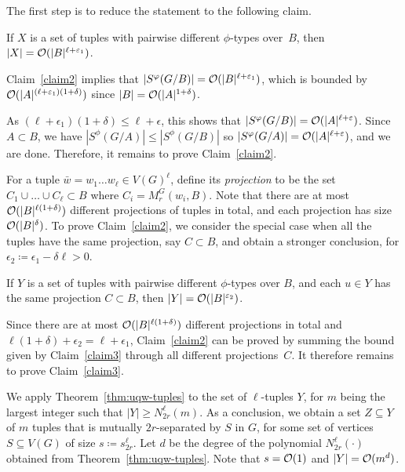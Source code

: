 	\setcounter{claim}{0}
%	
The first step is to reduce the statement to the following claim.

\begin{claim}\label{claim2}
If $X$ is a set of tuples with pairwise different $\phi$-types over~$B$, then $|X|=\mathcal{O}(|B|^{\ell+\varepsilon_1})$.
\end{claim}	

Claim~\ref{claim2} implies that $|S^\varphi(G/B)|=\mathcal{O}(|B|^{\ell+\varepsilon_1})$, 
which is bounded by $\mathcal{O}(|A|^{(\ell+\varepsilon_1)(1+\delta)})$ since $|B|=\mathcal{O}(|A|^{1+\delta})$. 

As $(\ell+\epsilon_1)(1+\delta)\le \ell+\epsilon$, this shows that $|S^\varphi(G/B)|=\mathcal{O}(|A|^{\ell+\varepsilon})$.
Since $A\subset B$, 
we have $|S^\phi(G/A)|\le |S^\phi(G/B)|$ so
 $|S^\varphi(G/A)|=\mathcal{O}(|A|^{\ell+\varepsilon})$, and we are done. Therefore, it remains to prove Claim~\ref{claim2}.

\medskip

For a tuple $\bar w=w_1\ldots w_\ell\in V(G)^\ell$, define its \emph{projection}
to be the set $C_1\cup\ldots\cup C_\ell\subset B$ where  
$C_i=M^G_r(w_i, B)$. Note that there are at most 
$\mathcal{O}(|B|^{\ell(1+\delta)})$ different projections of tuples in total, and each projection has size $\mathcal{O}(|B|^\delta)$.
To prove Claim~\ref{claim2}, we consider the special case when all the tuples have the same projection, say $C\subset B$, and  obtain a stronger conclusion,
for $\epsilon_2\coloneqq \epsilon_1-\delta\ell>0$.

\begin{claim}\label{claim3}
If $Y$ is a set of tuples with pairwise different $\phi$-types over $B$, and each $u\in Y$ has the same projection $C\subset B$, then $|Y|=\mathcal{O}(|B|^{\varepsilon_2})$.
\end{claim}

Since there are at most $\mathcal{O}(|B|^{\ell(1+\delta)})$ different projections in total and $\ell(1+\delta)+\epsilon_2=\ell+\epsilon_1$, Claim~\ref{claim2} can be proved
by summing the bound given by Claim~\ref{claim3} through all different projections~$C$.
It therefore remains to prove Claim~\ref{claim3}.

\medskip

We apply Theorem~\ref{thm:uqw-tuples} to the set of $\ell$-tuples $Y$, for $m$ being the largest integer such that $|Y|\ge N^{\ell}_{2r}(m)$.
  As a conclusion, we obtain a set $Z\subseteq Y$ of $m$ tuples that is mutually $2r$-separated by $S$ in $G$, for some set of vertices $S\subseteq V(G)$ of size $s\coloneqq s^{\ell}_{2r}$.
  Let $d$ be the degree of the polynomial $N^\ell_{2r}(\cdot)$ obtained from Theorem~\ref{thm:uqw-tuples}.
  Note that $s=\mathcal{O}(1)$ and $|Y|=\mathcal{O}(m^d)$.
    
